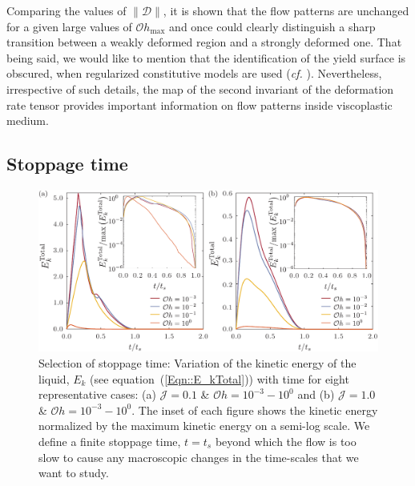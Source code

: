 \documentclass[final]{jfm}
\begin{document}
Comparing the values of $\|\boldsymbol{\mathcal{D}}\|$, it is shown that the flow patterns are unchanged for a given large values of $\mathcal{O}h_{\text{max}}$ and once could clearly distinguish a sharp transition between a weakly deformed region and a strongly deformed one. That being said, we would like to mention that the identification of the yield surface is obscured, when regularized constitutive models are used (\textit{cf.} \cite{frigaard2005usage}). Nevertheless, irrespective of such details, the map of the second invariant of the deformation rate tensor provides important information on flow patterns inside viscoplastic medium.

\subsection{Stoppage time}\label{App::StoppageTime}
\begin{figure}
	\centerline{\includegraphics[width=\linewidth]{FigureE2_StoppageTime-eps-converted-to.pdf}}%
	\caption{Selection of stoppage time: Variation of the kinetic energy of the liquid, $E_k$ (see equation~(\ref{Eqn::E_kTotal})) with time for eight representative cases: (a) $\mathcal{J} = 0.1$ \& $\mathcal{O}h = 10^{-3} - 10^0$ and (b) $\mathcal{J} = 1.0$  \& $\mathcal{O}h = 10^{-3} - 10^0$. The inset of each figure shows the kinetic energy normalized by the maximum kinetic energy on a semi-log scale. We define a finite stoppage time, $t = t_s$ beyond which the flow is too slow to cause any macroscopic changes in the time-scales that we want to study.}
	\label{fig:StoppageTime}
\end{figure}
\end{document}
